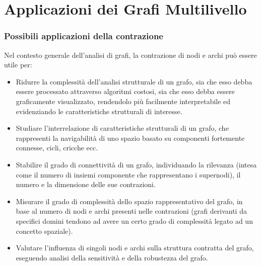 \chapter{Applicazioni dei Grafi Multilivello}

\subsection{Possibili applicazioni della contrazione}
Nel contesto generale dell'analisi di grafi, la contrazione di nodi e archi pu\`o essere utile per:
\begin{itemize}
    \item Ridurre la complessit\`a dell'analisi strutturale di un grafo, sia che esso debba essere processato
    attraverso algoritmi costosi, sia che esso debba essere graficamente visualizzato, rendendolo pi\`u facilmente
    interpretabile ed evidenziando le caratteristiche strutturali di interesse.
    \item Studiare l'interrelazione di caratteristiche strutturali di un grafo, che rappresenti la navigabilit\`a
    di uno spazio basato su componenti fortemente connesse, cicli, cricche ecc.
    \item Stabilire il grado di connettivit\`a di un grafo, individuando la rilevanza (intesa come il numero di
    insiemi componente che rappresentano i supernodi), il numero e la dimensione delle sue contrazioni.
    \item Misurare il grado di complessit\`a dello spazio rappresentativo del grafo, in base al numero
    di nodi e archi presenti nelle contrazioni (grafi derivanti da specifici domini tendono ad avere un certo grado
    di complessit\`a legato ad un concetto spaziale).
    \item Valutare l'influenza di singoli nodi e archi sulla struttura contratta del grafo, eseguendo analisi
    della sensitivit\`a e della robustezza del grafo.
\end{itemize}

